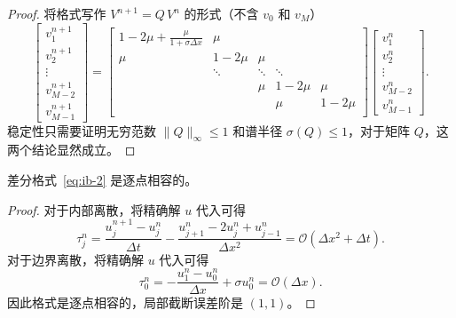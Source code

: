 \begin{proof}
    将格式写作 $V^{n+1} = Q\, V^n$ 的形式（不含 $v_0$ 和 $v_{M}$）
    \[
        \begin{bmatrix}
            v_1^{n+1} \\ v_2^{n+1} \\ \vdots \\ v_{M-2}^{n+1} \\ v_{M-1}^{n+1}
        \end{bmatrix}
        =
        \begin{bmatrix}
            1-2\mu + \frac{\mu}{1+\sigma \Delta x} & \mu    &        &        &        \\
            \mu                                    & 1-2\mu & \mu    &        &        \\
                                                   & \ddots & \ddots & \ddots &        \\
                                                   &        & \mu    & 1-2\mu & \mu    \\
                                                   &        &        & \mu    & 1-2\mu \\
        \end{bmatrix}
        \begin{bmatrix}
            v_1^{n} \\ v_2^{n} \\ \vdots \\ v_{M-2}^{n} \\ v_{M-1}^{n}
        \end{bmatrix}.
    \]
    稳定性只需要证明无穷范数 $\|Q\|_{\infty} \le 1$
    和谱半径 $\sigma(Q) \le 1$，对于矩阵 $Q$，这两个结论显然成立。
\end{proof}

\begin{example}
    差分格式~\eqref{eq:ib-2} 是逐点相容的。
\end{example}

\begin{proof}
    对于内部离散，将精确解 $u$ 代入可得
    \[
        \tau_j^n = \frac{u_{j}^{n+1}-u_j^n}{\Delta t} - \frac{u_{j+1}^{n}-2u_{j}^{n}+u_{j-1}^{n}}{\Delta x^2}
        = \mathcal{O}(\Delta x^2 + \Delta t).
    \]
    对于边界离散，将精确解 $u$ 代入可得
    \[
        \tau_0^n = - \frac{u_1^n - u_0^n}{\Delta x} + \sigma u_0^n = \mathcal{O}(\Delta x).
    \]
    因此格式是逐点相容的，局部截断误差阶是 $(1,1)$。
\end{proof}

